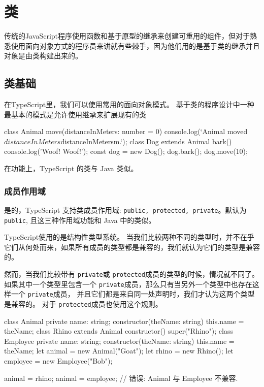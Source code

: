 \section{类}

传统的JavaScript程序使用函数和基于原型的继承来创建可重用的组件，但对于熟悉使用面向对象方式的程序员来讲就有些棘手，因为他们用的是基于类的继承并且对象是由类构建出来的。

\subsection{类基础}

在TypeScript里，我们可以使用常用的面向对象模式。 基于类的程序设计中一种最基本的模式是允许使用继承来扩展现有的类

\begin{TypeScript}
class Animal {
    move(distanceInMeters: number = 0) {
        console.log(`Animal moved ${distanceInMeters}${distanceInMeters}m.`);
    }
}
class Dog extends Animal {
    bark() {
        console.log('Woof! Woof!');
    }
}
const dog = new Dog();
dog.bark();
dog.move(10);
\end{TypeScript}

在功能上，TypeScript 的类与 Java 类似。

\subsubsection*{成员作用域}

是的，TypeScript 支持类成员作用域: \texttt{public, protected, private}。默认为 \texttt{public}, 且这三种作用域功能和 Java 中的类似。

TypeScript使用的是结构性类型系统。 当我们比较两种不同的类型时，并不在乎它们从何处而来，如果所有成员的类型都是兼容的，我们就认为它们的类型是兼容的。

然而，当我们比较带有 \texttt{private}或 \texttt{protected}成员的类型的时候，情况就不同了。 如果其中一个类型里包含一个 \texttt{private}成员，那么只有当另外一个类型中也存在这样一个 \texttt{private}成员， 并且它们都是来自同一处声明时，我们才认为这两个类型是兼容的。 对于 \texttt{protected}成员也使用这个规则。

\begin{TypeScript}
class Animal {
    private name: string;
    constructor(theName: string) { this.name = theName; }
}
class Rhino extends Animal {
    constructor() { super("Rhino"); }
}
class Employee {
    private name: string;
    constructor(theName: string) { this.name = theName; }
}
let animal = new Animal("Goat");
let rhino = new Rhino();
let employee = new Employee("Bob");

animal = rhino;
animal = employee; // 错误: Animal 与 Employee 不兼容.
\end{TypeScript}

